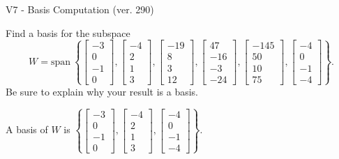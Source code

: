 \begin{exercise}
  \begin{exerciseTitle}V7 - Basis Computation (ver. 290)\end{exerciseTitle}
  \begin{exerciseStatement}
    Find a basis for the subspace 
\[W=\mathrm{span}\ \left\{\left[\begin{array}{r}
-3 \\
0 \\
-1 \\
0
\end{array}\right] , \left[\begin{array}{r}
-4 \\
2 \\
1 \\
3
\end{array}\right] , \left[\begin{array}{r}
-19 \\
8 \\
3 \\
12
\end{array}\right] , \left[\begin{array}{r}
47 \\
-16 \\
-3 \\
-24
\end{array}\right] , \left[\begin{array}{r}
-145 \\
50 \\
10 \\
75
\end{array}\right] , \left[\begin{array}{r}
-4 \\
0 \\
-1 \\
-4
\end{array}\right]\right\}.\]
 Be sure to explain why your result is a basis.


  \end{exerciseStatement}
  \begin{exerciseAnswer}
   A basis of \(W\) is  \(\left\{\left[\begin{array}{r}
-3 \\
0 \\
-1 \\
0
\end{array}\right] , \left[\begin{array}{r}
-4 \\
2 \\
1 \\
3
\end{array}\right] , \left[\begin{array}{r}
-4 \\
0 \\
-1 \\
-4
\end{array}\right]\right\}\).
  


  \end{exerciseAnswer}
\end{exercise}